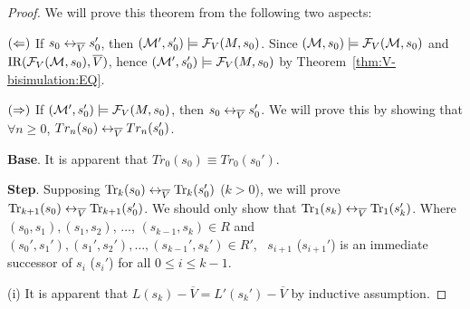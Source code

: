 \documentclass{article}
\begin{document}
\begin{proof}
We will prove this theorem from the following two aspects:

$(\Leftarrow)$ If $s_0 \leftrightarrow_{\overline V} s_0'$, then $({\cal M}',s_0') \models {\cal F}_V(M,s_0)$. Since $({\cal M}, s_0) \models {\cal F}_V({\cal M}, s_0)$ and $\textrm{IR}({\cal F}_V({\cal M}, s_0), \overline V)$, hence
$({\cal M}',s_0') \models {\cal F}_V(M,s_0)$ by Theorem~\ref{thm:V-bisimulation:EQ}.

$(\Rightarrow)$ If $({\cal M}',s_0') \models {\cal F}_V(M,s_0)$, then $s_0 \leftrightarrow_{\overline V} s_0'$. We will prove this by showing that $\forall n \geq 0$, $Tr_n(s_0) \leftrightarrow_{\overline V} Tr_n(s_0')$.

\textbf{Base}. It is apparent that $Tr_0(s_0) \equiv Tr_0(s_0')$.

\textbf{Step}. Supposing $\textrm{Tr}_k(s_0) \leftrightarrow_{\overline V} \textrm{Tr}_k(s_0')$ ($k > 0$), we will prove $\textrm{Tr}_{k+1}(s_0) \leftrightarrow_{\overline V} \textrm{Tr}_{k+1}(s_0')$. We should only show that $\textrm{Tr}_1(s_k) \leftrightarrow_{\overline V} \textrm{Tr}_1(s_k')$. Where $(s_0, s_1), (s_1, s_2)$, $\dots$, $(s_{k-1}, s_k) \in R$ and $(s_0', s_1'), (s_1', s_2'), \dots, (s_{k-1}', s_k') \in R'$, \ie\ $s_{i+1}$ ($s_{i+1}'$) is an immediate successor of $s_i$ ($s_i'$) for all $0 \leq i \leq k-1$.

      (i) It is apparent that $L(s_k) - \overline V = L'(s_k') - \overline V$ by inductive assumption.


\end{proof}
\end{document}
